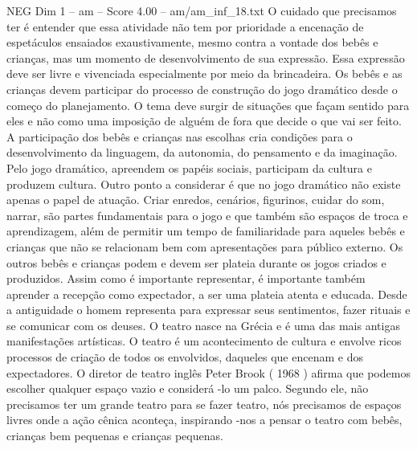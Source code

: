 \begin{textsample}{NEG Dim 1 – am – Score 4.00 – am/am\_inf\_18.txt}
O cuidado que precisamos ter é entender que essa atividade não tem por prioridade a encenação de espetáculos ensaiados exaustivamente, mesmo contra a vontade dos bebês e crianças, mas um momento de desenvolvimento de sua expressão.
Essa expressão deve ser livre e vivenciada especialmente por meio da brincadeira.
Os bebês e as crianças devem participar do processo de construção do jogo dramático desde o começo do planejamento.
O tema deve surgir de situações que façam sentido para eles e não como uma imposição de alguém de fora que decide o que vai ser feito.
A participação dos bebês e crianças nas escolhas cria condições para o desenvolvimento da linguagem, da autonomia, do pensamento e da imaginação.
Pelo jogo dramático, apreendem os papéis sociais, participam da cultura e produzem cultura.
Outro ponto a considerar é que no jogo dramático não existe apenas o papel de atuação.
Criar enredos, cenários, figurinos, cuidar do som, narrar, são partes fundamentais para o jogo e que também são espaços de troca e aprendizagem, além de permitir um tempo de familiaridade para aqueles bebês e crianças que não se relacionam bem com apresentações para público externo.
Os outros bebês e crianças podem e devem ser plateia durante os jogos criados e produzidos.
Assim como é importante representar, é importante também aprender a recepção como expectador, a ser uma plateia atenta e educada.
Desde a antiguidade o homem representa para expressar seus sentimentos, fazer rituais e se comunicar com os deuses.
O teatro nasce na Grécia e é uma das mais antigas manifestações artísticas.
O teatro é um acontecimento de cultura e envolve ricos processos de criação de todos os envolvidos, daqueles que encenam e dos expectadores.
O diretor de teatro inglês Peter Brook ( 1968 ) afirma que podemos escolher qualquer espaço vazio e considerá -lo um palco.
Segundo ele, não precisamos ter um grande teatro para se fazer teatro, nós precisamos de espaços livres onde a ação cênica aconteça, inspirando -nos a pensar o teatro com bebês, crianças bem pequenas e crianças pequenas.

\end{textsample}
